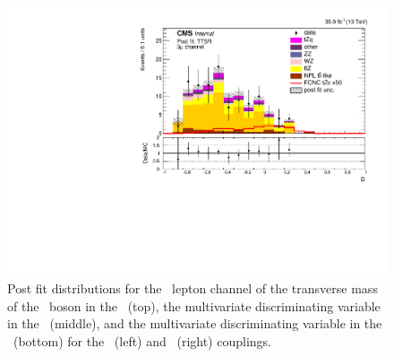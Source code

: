 \begin{figure}[htbp]
	\includegraphics[width=0.49\linewidth]{6_Search/Figures/ZctFit/shapes_fit_s_LepChan_3mu_TTSR_error_trial.pdf}
	\caption{Post fit distributions for the \mumumu\ lepton channel of the transverse mass of the \PW\ boson in the \WZCR\ (top), the multivariate discriminating variable in the \STSR\ (middle), and the multivariate discriminating variable in the \TTSR\ (bottom) for the \Zut\ (left) and \Zct\ (right) couplings. }
	\label{fig:shapesfit3mu}
\end{figure}


